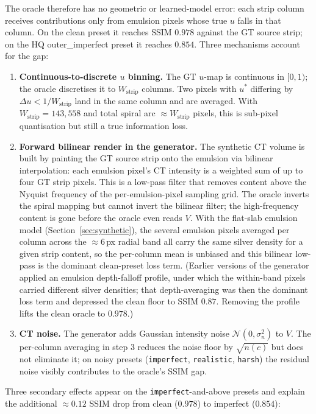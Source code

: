 \documentclass[11pt,a4paper]{article}
\begin{document}
The oracle therefore has no geometric or learned-model error: each strip column receives contributions only from emulsion pixels whose true $u$ falls in that column. On the clean preset it reaches SSIM $0.978$ against the GT source strip; on the HQ outer\_imperfect preset it reaches $0.854$. Three mechanisms account for the gap:

\begin{enumerate}
    \item \textbf{Continuous-to-discrete $u$ binning.} The GT $u$-map is continuous in $[0, 1)$; the oracle discretises it to $W_{\text{strip}}$ columns. Two pixels with $u^*$ differing by $\Delta u < 1/W_{\text{strip}}$ land in the same column and are averaged. With $W_{\text{strip}} = 143{,}558$ and total spiral arc $\approx W_{\text{strip}}$ pixels, this is sub-pixel quantisation but still a true information loss.
    \item \textbf{Forward bilinear render in the generator.} The synthetic CT volume is built by painting the GT source strip onto the emulsion via bilinear interpolation: each emulsion pixel's CT intensity is a weighted sum of up to four GT strip pixels. This is a low-pass filter that removes content above the Nyquist frequency of the per-emulsion-pixel sampling grid. The oracle inverts the spiral mapping but cannot invert the bilinear filter; the high-frequency content is gone before the oracle even reads $V$. With the flat-slab emulsion model (Section~\ref{sec:synthetic}), the several emulsion pixels averaged per column across the $\approx 6$\,px radial band all carry the same silver density for a given strip content, so the per-column mean is unbiased and this bilinear low-pass is the dominant clean-preset loss term. (Earlier versions of the generator applied an emulsion depth-falloff profile, under which the within-band pixels carried different silver densities; that depth-averaging was then the dominant loss term and depressed the clean floor to SSIM $0.87$. Removing the profile lifts the clean oracle to $0.978$.)
    \item \textbf{CT noise.} The generator adds Gaussian intensity noise $\mathcal{N}(0, \sigma_n^2)$ to $V$. The per-column averaging in step 3 reduces the noise floor by $\sqrt{n(c)}$ but does not eliminate it; on noisy presets (\texttt{imperfect}, \texttt{realistic}, \texttt{harsh}) the residual noise visibly contributes to the oracle's SSIM gap.
\end{enumerate}

Three secondary effects appear on the \texttt{imperfect}-and-above presets and explain the additional $\approx 0.12$ SSIM drop from clean ($0.978$) to imperfect ($0.854$):
\end{document}

